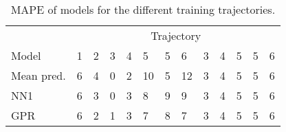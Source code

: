 \begin{table}[H]
  \centering
  \caption{MAPE of models for the different training trajectories.}
  \label{fig:model-mape-of-trajs}
  \begin{tabular}{l | l | l | l | l | l | l | l | l | l | l | l | l }
    & \multicolumn{12}{c}{Trajectory} \\
    Model        & 1 & 2 & 3 & 4 & 5  & 5 & 6 & 3 & 4 & 5  & 5 & 6 \\
    \hline
    Mean pred.  & 6 & 4 & 0 & 2 & 10 & 5 & 12 & 3 & 4 & 5  & 5 & 6 \\
    NN1         & 6 & 3 & 0 & 3 &  8 & 9 &  9 & 3 & 4 & 5  & 5 & 6 \\
    GPR         & 6 & 2 & 1 & 3 &  7 & 8 &  7 & 3 & 4 & 5  & 5 & 6 \\
  \end{tabular}
\end{table}





